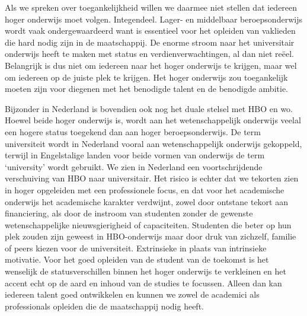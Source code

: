 \documentclass[empirical, authordate, ]{new-jote-article}
\begin{document}
	Als we spreken over toegankelijkheid willen we daarmee niet stellen dat iedereen hoger onderwijs moet volgen. Integendeel. Lager- en middelbaar beroepsonderwijs wordt vaak ondergewaardeerd want is essentieel voor het opleiden van vaklieden die hard nodig zijn in de maatschappij. De enorme stroom naar het universitair onderwijs heeft te maken met status en verdienverwachtingen, al dan niet reëel. Belangrijk is dus niet om iedereen naar het hoger onderwijs te krijgen, maar wel om iedereen op de juiste plek te krijgen. Het hoger onderwijs zou toegankelijk moeten zijn voor diegenen met het benodigde talent en de benodigde ambitie.



	Bijzonder in Nederland is bovendien ook nog het duale stelsel met HBO en wo. Hoewel beide hoger onderwijs is, wordt aan het wetenschappelijk onderwijs veelal een hogere status toegekend dan aan hoger beroepsonderwijs. De term universiteit wordt in Nederland vooral aan wetenschappelijk onderwijs gekoppeld, terwijl in Engelstalige landen voor beide vormen van onderwijs de term ‘university' wordt gebruikt. We zien in Nederland een voortschrijdende verschuiving van HBO naar universitair. Het risico is echter dat we tekorten zien in hoger opgeleiden met een professionele focus, en dat voor het academische onderwijs het academische karakter verdwijnt, zowel door ontstane tekort aan financiering, als door de instroom van studenten zonder de gewenste wetenschappelijke nieuwsgierigheid of capaciteiten. Studenten die beter op hun plek zouden zijn geweest in HBO-onderwijs maar door druk van zichzelf, familie of peers kiezen voor de universiteit. Extrinsieke in plaats van intrinsieke motivatie. Voor het goed opleiden van de student van de toekomst is het wenselijk de statusverschillen binnen het hoger onderwijs te verkleinen en het accent echt op de aard en inhoud van de studies te focussen. Alleen dan kan iedereen talent goed ontwikkelen en kunnen we zowel de academici als professionals opleiden die de maatschappij nodig heeft.
\end{document}
